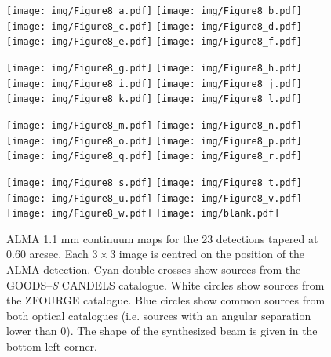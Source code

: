 \documentclass[longauth]{aa}
\begin{document}
\begin{figure*}
\centering

\begin{minipage}[t]{0.9\textwidth}
\resizebox{\hsize}{!} {
\texttt{[image: img/Figure8\_a.pdf]}
\texttt{[image: img/Figure8\_b.pdf]}
\texttt{[image: img/Figure8\_c.pdf]}
\texttt{[image: img/Figure8\_d.pdf]}
\texttt{[image: img/Figure8\_e.pdf]}
\texttt{[image: img/Figure8\_f.pdf]}
}
\end{minipage}
\begin{minipage}[t]{0.9\textwidth}
\resizebox{\hsize}{!} {
\texttt{[image: img/Figure8\_g.pdf]}
\texttt{[image: img/Figure8\_h.pdf]}
\texttt{[image: img/Figure8\_i.pdf]}
\texttt{[image: img/Figure8\_j.pdf]}
\texttt{[image: img/Figure8\_k.pdf]}
\texttt{[image: img/Figure8\_l.pdf]}
}
\end{minipage}

\begin{minipage}[t]{0.9\textwidth}
\resizebox{\hsize}{!} {
\texttt{[image: img/Figure8\_m.pdf]}
\texttt{[image: img/Figure8\_n.pdf]}
\texttt{[image: img/Figure8\_o.pdf]}
\texttt{[image: img/Figure8\_p.pdf]}
\texttt{[image: img/Figure8\_q.pdf]}
\texttt{[image: img/Figure8\_r.pdf]}
}
\end{minipage}
\begin{minipage}[t]{0.9\textwidth}
\resizebox{\hsize}{!} {
\texttt{[image: img/Figure8\_s.pdf]}
\texttt{[image: img/Figure8\_t.pdf]}
\texttt{[image: img/Figure8\_u.pdf]}
\texttt{[image: img/Figure8\_v.pdf]}
\texttt{[image: img/Figure8\_w.pdf]}
\texttt{[image: img/blank.pdf]}
}
\end{minipage}
\caption{ALMA 1.1 mm continuum maps for the 23 detections tapered at 0.60 arcsec. Each 3\,$\times$\,3 image is centred on the position of the ALMA detection. Cyan double crosses show sources from the GOODS--\textit{S} CANDELS catalogue. White circles show sources from the ZFOURGE catalogue. Blue circles show common sources from both optical catalogues (i.e. sources with an angular separation lower than 0). The shape of the synthesized beam is given in the bottom left corner.}
\label{compare_CANDELS/ZFOURGE}
\end{figure*}
\end{document}
